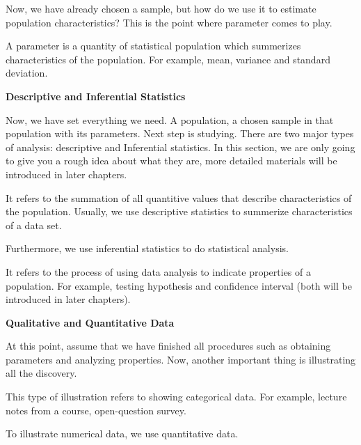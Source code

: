 \noindent
Now, we have already chosen a sample, but how do we use it to estimate population characteristics? This is the point where parameter comes to play.

\begin{definition}
A parameter is a quantity of statistical population which summerizes characteristics of the population. For example, mean, variance and standard deviation.
\end{definition}

\noindent
\textbf{Descriptive and Inferential Statistics}

\noindent
Now, we have set everything we need. A population, a chosen sample in that population with its parameters. Next step is studying. There are two major types of analysis: descriptive and Inferential statistics. In this section, we are only going to give you a rough idea about what they are, more detailed materials will be introduced in later chapters.

\begin{definition}
It refers to the summation of all quantitive values that describe characteristics of the population. Usually, we use descriptive statistics to summerize characteristics of a data set.
\end{definition}

\noindent
Furthermore, we use inferential statistics to do statistical analysis.

\begin{definition}
It refers to the process of using data analysis to indicate properties of a population. For example, testing hypothesis and confidence interval (both will be introduced in later chapters).
\end{definition}

\noindent
\textbf{Qualitative and Quantitative Data}

\noindent
At this point, assume that we have finished all procedures such as obtaining parameters and analyzing properties. Now, another important thing is illustrating all the discovery. 

\begin{definition}
This type of illustration refers to showing categorical data. For example, lecture notes from a course, open-question survey. 
\end{definition}

\noindent
To illustrate numerical data, we use quantitative data.

